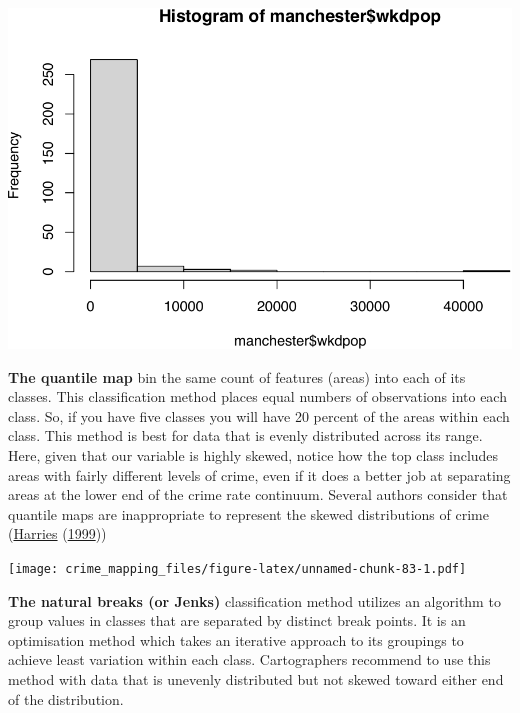 \documentclass[
]{book}
\begin{document}
\includegraphics{crime_mapping_files/figure-latex/unnamed-chunk-82-1.pdf}

\textbf{The quantile map} bin the same count of features (areas) into each of its classes. This classification method places equal numbers of observations into each class. So, if you have five classes you will have 20 percent of the areas within each class. This method is best for data that is evenly distributed across its range. Here, given that our variable is highly skewed, notice how the top class includes areas with fairly different levels of crime, even if it does a better job at separating areas at the lower end of the crime rate continuum. Several authors consider that quantile maps are inappropriate to represent the skewed distributions of crime (\protect\hyperlink{ref-Harries_1999}{Harries} (\protect\hyperlink{ref-Harries_1999}{1999}))

\texttt{[image: crime\_mapping\_files/figure-latex/unnamed-chunk-83-1.pdf]}

\textbf{The natural breaks (or Jenks)} classification method utilizes an algorithm to group values in classes that are separated by distinct break points. It is an optimisation method which takes an iterative approach to its groupings to achieve least variation within each class. Cartographers recommend to use this method with data that is unevenly distributed but not skewed toward either end of the distribution.
\end{document}
